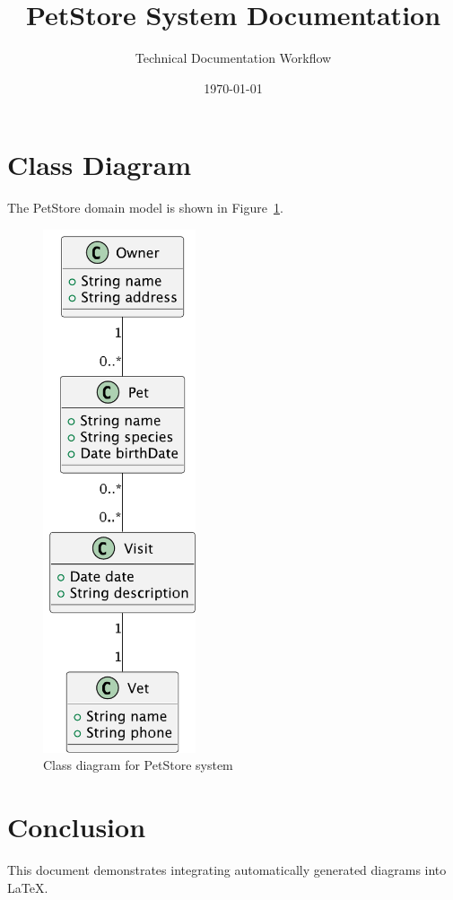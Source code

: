 \documentclass[12pt]{scrartcl}
\title{PetStore System Documentation}
\author{Technical Documentation Workflow}
\date{\today}
\begin{document}
\maketitle

\section{Class Diagram}

The PetStore domain model is shown in Figure~\ref{fig:classdiagram}.

\begin{figure}[ht]
    \centering
    \includegraphics[width=0.4\textwidth]{../figures/petstore-classdiagram.pdf}
    \caption{Class diagram for PetStore system}
    \label{fig:classdiagram}
\end{figure}

\section{Conclusion}

This document demonstrates integrating automatically generated diagrams into LaTeX.
\end{document}
